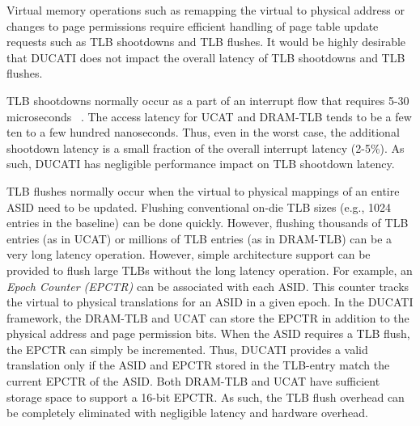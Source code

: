 % 

\noindent Virtual memory operations such as remapping the virtual to
physical address or changes to page permissions require efficient
handling of page table update requests such as TLB shootdowns and TLB
flushes. It would be highly desirable that DUCATI does not impact the
overall latency of TLB shootdowns and TLB flushes.

TLB shootdowns normally occur as a part of an interrupt flow that
requires 5-30 microseconds ~\cite{zhengpagedgpu}. The access latency
for UCAT and DRAM-TLB tends to be a few ten to a few hundred nanoseconds. Thus, even in the worst case, the additional shootdown
latency is a small fraction of the overall interrupt latency (2-5\%).
As such, DUCATI has negligible performance impact on TLB shootdown
latency.

TLB flushes normally occur when the virtual to physical mappings of an
entire ASID need to be updated. Flushing conventional on-die TLB sizes
(e.g., 1024 entries in the baseline) can be done quickly. However,
flushing thousands of TLB entries (as in UCAT) or millions of TLB
entries (as in DRAM-TLB) can be a very long latency operation.
However, simple architecture support can be provided to flush large
TLBs without the long latency operation. For example, an {\em Epoch
Counter (EPCTR)} can be associated with each ASID. This counter tracks
the virtual to physical translations for an ASID in a given epoch. In
the DUCATI framework, the DRAM-TLB and UCAT can store the EPCTR in
addition to the physical address and page permission bits. When the
ASID requires a TLB flush, the EPCTR can simply be incremented. Thus,
DUCATI provides a valid translation only if the ASID and EPCTR stored
in the TLB-entry match the current EPCTR of the ASID. Both DRAM-TLB
and UCAT have sufficient storage space to support a 16-bit EPCTR. As
such, the TLB flush overhead can be completely eliminated with
negligible latency and hardware overhead.


% 

